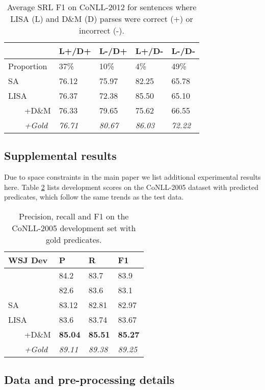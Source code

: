 \documentclass[11pt,a4paper]{article}
\begin{document}
\begin{table}
\begin{tabular}{lllll}
& L+/D+ & L-/D+ & L+/D- & L-/D- \\ \hline \hline
Proportion & 37\% &	10\% &	4\% &	49\% \\ \hline
SA & 76.12 & 75.97 & 82.25 &	65.78 \\ 
LISA & 76.37 &	72.38 &	85.50 &	65.10 \\
\ \ \ \ +D\&M & 76.33	& 79.65 &	75.62 &	66.55 \\
\ \ \ \ \emph{+Gold} & \emph{76.71} & \emph{80.67} & \emph{86.03} & \emph{72.22} \\
\end{tabular}
\caption{Average SRL F1 on CoNLL-2012 for sentences where LISA (L) and D\&M (D) parses were correct (+) or incorrect (-). \label{tab:app:parse-srl-by-sents}}
\end{table}

\subsection{Supplemental results}

Due to space constraints in the main paper we list additional experimental results here. Table \ref{tab:conll05-gold-pred-dev} lists development scores on the CoNLL-2005 dataset with predicted predicates, which follow the same trends as the test data.

\begin{table}
\begin{tabular}{llll}
WSJ Dev & P & R & F1 \\ \hline \hline
\citet{he2018jointly} & 84.2 & 83.7 & 83.9 \\
\citet{tan2018deep} & 82.6	& 83.6 &	83.1 \\ \hline
SA & 83.12 &	82.81 &	82.97 \\
LISA & 83.6 &	83.74	& 83.67 \\
\ \ \ \ +D\&M & {\bf 85.04} &	{\bf 85.51} &	{\bf 85.27} \\
\ \ \ \ \emph{+Gold} & \emph{89.11} &	\emph{89.38} & 	\emph{89.25}
\end{tabular}
\caption{Precision, recall and F1 on the CoNLL-2005 development set with gold predicates. \label{tab:conll05-gold-pred-dev}}
\end{table}

\subsection{Data and pre-processing details}
\end{document}
